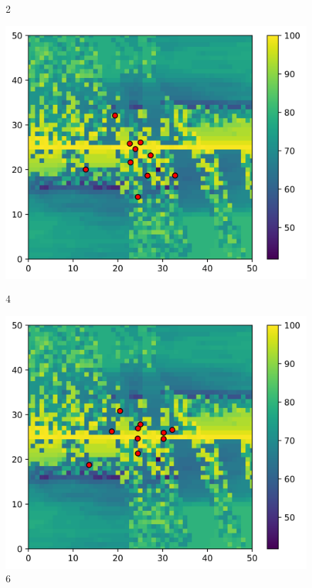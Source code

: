 \begin{figure}[H]
\begin{minipage}{0.5\textwidth}
		\caption{2}
		\label{2}
	\end{minipage}\par
		\centering
	\begin{minipage}{0.5\textwidth}
		\includegraphics[width=\textwidth]{figures/swarm/4.png}
		\caption{4}
		\label{4}
	\end{minipage}\hfill
	\begin{minipage}{0.5\textwidth}
		\includegraphics[width=\textwidth]{figures/swarm/6.png}
		\caption{6}
		\label{6}
	\end{minipage}\par

\end{figure}
